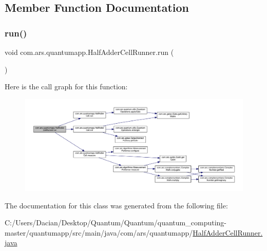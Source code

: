 \subsection{Member Function Documentation}
\hypertarget{classcom_1_1ars_1_1quantumapp_1_1_half_adder_cell_runner_a4f4ba989df2058187640a1868856c0c7}{}\label{classcom_1_1ars_1_1quantumapp_1_1_half_adder_cell_runner_a4f4ba989df2058187640a1868856c0c7} 
\subsubsection{\texorpdfstring{run()}{run()}}
{\footnotesize\ttfamily void com.\+ars.\+quantumapp.\+Half\+Adder\+Cell\+Runner.\+run (\begin{DoxyParamCaption}{ }\end{DoxyParamCaption})}

Here is the call graph for this function\+:\nopagebreak
\begin{figure}[H]
\begin{center}
\leavevmode
\includegraphics[width=350pt]{classcom_1_1ars_1_1quantumapp_1_1_half_adder_cell_runner_a4f4ba989df2058187640a1868856c0c7_cgraph}
\end{center}
\end{figure}


The documentation for this class was generated from the following file\+:\begin{DoxyCompactItemize}
\item 
C\+:/\+Users/\+Dacian/\+Desktop/\+Quantum/\+Quantum/quantum\+\_\+computing-\/master/quantumapp/src/main/java/com/ars/quantumapp/\hyperlink{_half_adder_cell_runner_8java}{Half\+Adder\+Cell\+Runner.\+java}\end{DoxyCompactItemize}
